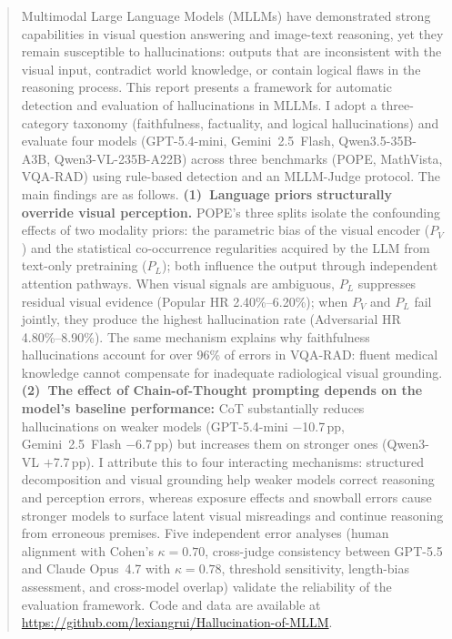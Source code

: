 \begin{abstract}
Multimodal Large Language Models (MLLMs) have demonstrated strong capabilities
in visual question answering and image-text reasoning,
yet they remain susceptible to hallucinations:
outputs that are inconsistent with the visual input,
contradict world knowledge,
or contain logical flaws in the reasoning process.
This report presents a framework
for automatic detection and evaluation of hallucinations in MLLMs.
I adopt a three-category taxonomy
(faithfulness, factuality, and logical hallucinations)
and evaluate four models
(GPT-5.4-mini, Gemini~2.5~Flash,
Qwen3.5-35B-A3B, Qwen3-VL-235B-A22B)
across three benchmarks (POPE, MathVista, VQA-RAD)
using rule-based detection and an MLLM-Judge protocol.
The main findings are as follows.
\textbf{(1)~Language priors structurally override visual perception.}
POPE's three splits isolate the confounding effects of two modality priors:
the parametric bias of the visual encoder ($P_V$)
and the statistical co-occurrence regularities
acquired by the LLM from text-only pretraining ($P_L$);
both influence the output through independent attention pathways.
When visual signals are ambiguous,
$P_L$ suppresses residual visual evidence
(Popular HR 2.40\%--6.20\%);
when $P_V$ and $P_L$ fail jointly,
they produce the highest hallucination rate
(Adversarial HR 4.80\%--8.90\%).
The same mechanism explains why faithfulness hallucinations
account for over 96\% of errors in VQA-RAD:
fluent medical knowledge cannot compensate
for inadequate radiological visual grounding.
\textbf{(2)~The effect of Chain-of-Thought prompting
depends on the model's baseline performance:}
CoT substantially reduces hallucinations on weaker models
(GPT-5.4-mini $-$10.7\,pp, Gemini~2.5~Flash $-$6.7\,pp)
but increases them on stronger ones
(Qwen3-VL $+$7.7\,pp).
I attribute this to four interacting mechanisms:
structured decomposition and visual grounding help weaker models
correct reasoning and perception errors,
whereas exposure effects and snowball errors cause stronger models
to surface latent visual misreadings
and continue reasoning from erroneous premises.
Five independent error analyses
(human alignment with Cohen's $\kappa = 0.70$,
cross-judge consistency between GPT-5.5 and Claude Opus~4.7 with $\kappa = 0.78$,
threshold sensitivity, length-bias assessment,
and cross-model overlap)
validate the reliability of the evaluation framework.
Code and data are available at
\url{https://github.com/lexiangrui/Hallucination-of-MLLM}.
\end{abstract}
